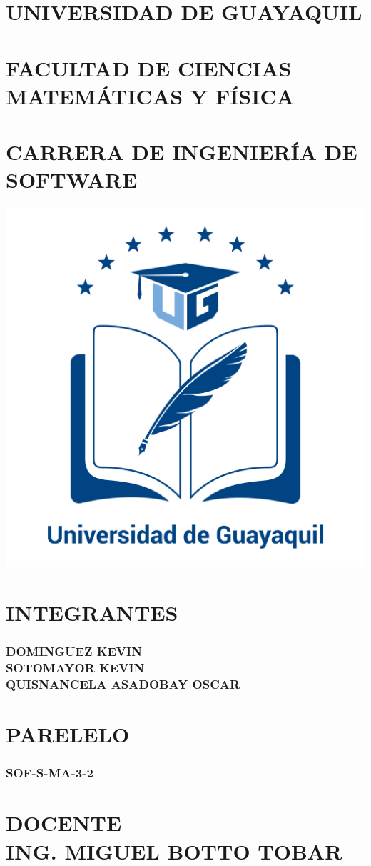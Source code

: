 \documentclass[11pt,a4paper]{article}
\begin{document}
\begin{center}
\section*{UNIVERSIDAD DE GUAYAQUIL}
\section*{FACULTAD DE CIENCIAS MATEMÁTICAS Y FÍSICA}
\section*{CARRERA DE INGENIERÍA DE SOFTWARE}
\includegraphics[scale=0.3]{UGlogo.png} 
\section*{INTEGRANTES}
\subsubsection*{DOMINGUEZ KEVIN\\SOTOMAYOR KEVIN\\QUISNANCELA ASADOBAY OSCAR}
\section*{PARELELO}
\subsubsection*{SOF-S-MA-3-2}
\section*{DOCENTE\\ING. MIGUEL BOTTO TOBAR}
\end{center}
\newpage
\end{document}
